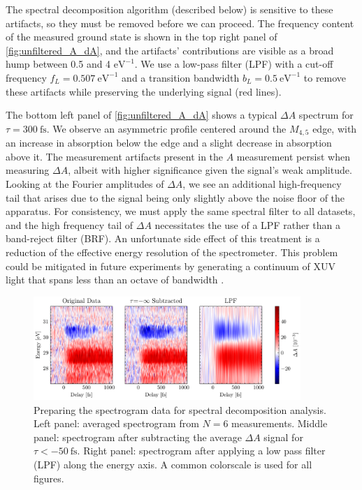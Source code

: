 The spectral decomposition algorithm (described below) is sensitive to these artifacts, so they must be removed before we can proceed. The frequency content of the measured ground state is shown in the top right panel of \cref{fig:unfiltered_A_dA}, and the artifacts' contributions are visible as a broad hump between 0.5 and 4 $\textrm{eV}^{-1}$. We use a low-pass filter (LPF) with a cut-off frequency $f_L = 0.507 \ \textrm{eV}^{-1}$ and a transition bandwidth $b_L = 0.5 \ \textrm{eV}^{-1}$ to remove these artifacts while preserving the underlying signal (red lines).

The bottom left panel of \cref{fig:unfiltered_A_dA} shows a typical $\Delta A$ spectrum for $\tau = 300 \ \textrm{fs}$. We observe an asymmetric profile centered around the $M_{4,5}$ edge, with an increase in absorption below the edge and a slight decrease in absorption above it. The measurement artifacts present in the $A$ measurement persist when measuring $\Delta A$, albeit with higher significance given the signal's weak amplitude. Looking at the Fourier amplitudes of $\Delta A$, we see an additional high-frequency tail that arises due to the signal being only slightly above the noise floor of the apparatus. For consistency, we must apply the same spectral filter to all datasets, and the high frequency tail of $\Delta A$ necessitates the use of a LPF rather than a band-reject filter (BRF). An unfortunate side effect of this treatment is a reduction of the effective energy resolution of the spectrometer. This problem could be mitigated in future experiments by generating a continuum of XUV light that spans less than an octave of bandwidth \cite{zurchDirectSimultaneousObservation2017}.


\begin{figure}
	\centering
	\includegraphics[width=0.9\textwidth]{figures/chap4/orig_sub_filt_spectrogram.pdf}
	\caption{Preparing the spectrogram data for spectral decomposition analysis. Left panel: averaged spectrogram from $N=6$ measurements. Middle panel: spectrogram after subtracting the average $\Delta A$ signal for $\tau < - 50 \ \textrm{fs}$. Right panel: spectrogram after applying a low pass filter (LPF) along the energy axis. A common colorscale is used for all figures.}
	\label{fig:orig_sub_filt_spectrogram}
\end{figure}

